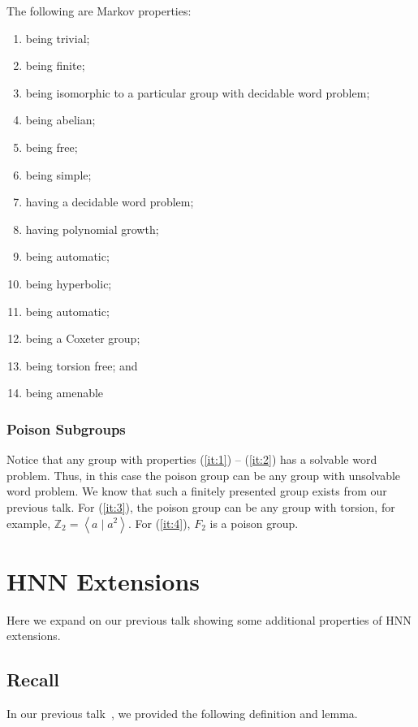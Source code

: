 \documentclass[11pt,a4paper,reqno]{amsart}
\theoremstyle{plain}
\theoremstyle{definition}
\theoremstyle{definition}
\begin{document}
The following are Markov properties:
\begin{enumerate}
	\item\label{it:1} being trivial;
	\item being finite;
	\item being isomorphic to a particular group with decidable word problem;
	\item being abelian;
	\item being free;
	\item being simple;
	\item having a decidable word problem;
	\item having polynomial growth;
	\item being automatic;
	\item being hyperbolic;
	\item being automatic;
	      \item\label{it:2} being a Coxeter group;
	      \item\label{it:3} being torsion free; and
	      \item\label{it:4} being amenable
\end{enumerate}

\subsubsection{Poison Subgroups}

Notice that any group with properties (\ref{it:1}) -- (\ref{it:2}) has a solvable word problem.
Thus, in this case the poison group can be any group with unsolvable word problem.
We know that such a finitely presented group exists from our previous talk.
For (\ref{it:3}), the poison  group can be any group with torsion, for example, $\mathbb Z_2 = \left\langle a \mid a^2\right\rangle$.
For (\ref{it:4}), $F_2$ is a poison group.

\section{HNN Extensions}

Here we expand on our previous talk showing some additional properties of HNN extensions.

\subsection{Recall}
In our previous talk~\cite{minicoursePart1}, we provided the following definition and lemma.
\end{document}
